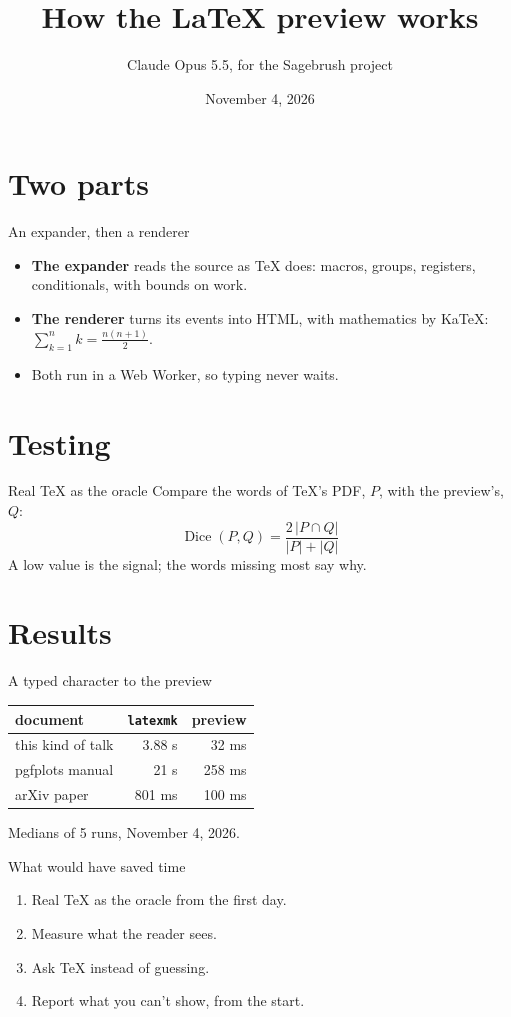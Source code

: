\documentclass{beamer}
\title[The LaTeX preview]{How the \LaTeX{} preview works}
\author[Sagebrush]{Claude Opus 5.5, for the Sagebrush project}
\date{November 4, 2026}
\begin{document}
\begin{frame}
  \titlepage
\end{frame}

\section{Two parts}

\begin{frame}{An expander, then a renderer}
  \begin{itemize}
    \item<1-> \textbf{The expander} reads the source as \TeX{} does: macros,
      groups, registers, conditionals, with bounds on work.
    \item<2-> \textbf{The renderer} turns its events into HTML, with
      mathematics by KaTeX: $\displaystyle\sum_{k=1}^{n} k = \frac{n(n+1)}{2}$.
    \item<3-> Both run in a Web Worker, so typing never waits.
  \end{itemize}
\end{frame}

\section{Testing}

\begin{frame}{Real \TeX{} as the oracle}
  Compare the words of \TeX{}'s PDF, $P$, with the preview's, $Q$:
  \[
    \operatorname{Dice}(P, Q) = \frac{2\,|P \cap Q|}{|P| + |Q|}
  \]
  \pause
  A low value is the signal; the words missing most say why.
\end{frame}

\section{Results}

\begin{frame}{A typed character to the preview}
  \begin{center}
  \begin{tabular}{lrr}
    \hline
    document & \texttt{latexmk} & preview \\
    \hline
    this kind of talk & 3.88 s & 32 ms \\
    pgfplots manual & 21 s & 258 ms \\
    arXiv paper & 801 ms & 100 ms \\
    \hline
  \end{tabular}
  \end{center}
  \medskip
  Medians of 5 runs, November 4, 2026.
\end{frame}

\begin{frame}{What would have saved time}
  \begin{enumerate}
    \item Real \TeX{} as the oracle from the first day.
    \item Measure what the reader sees.
    \item Ask \TeX{} instead of guessing.
    \item Report what you can't show, from the start.
  \end{enumerate}
\end{frame}
\end{document}
